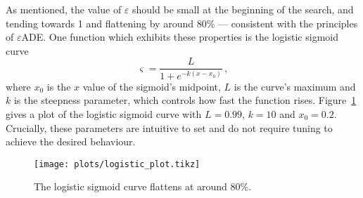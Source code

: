 As mentioned, the value of $\varepsilon$ should be small at the beginning of the search, and tending towards 1 and flattening by around 80\% --- consistent with the principles of $\varepsilon$ADE. One function which exhibits these properties is the logistic sigmoid curve
\begin{equation}\label{eq:logistic}
\varsigma = \dfrac{L}{1+e^{-k(x-x_0)}}\,,
\end{equation}
where $x_0$ is the $x$ value of the sigmoid's midpoint, $L$ is the curve's maximum and $k$ is the steepness parameter, which controls how fast the function rises. Figure~\ref{fig:logistic} gives a plot of the logistic sigmoid curve with $L=0.99$, $k=10$ and $x_0 = 0.2$.  Crucially, these parameters are intuitive to set and do not require tuning to achieve the desired behaviour.
\begin{figure}[h!]
  \centering
  \texttt{[image: plots/logistic\_plot.tikz]}  
  \caption{The logistic sigmoid curve flattens at around 80\%.} 
    \label{fig:logistic}
\end{figure}

